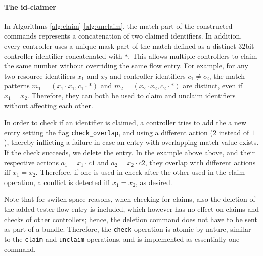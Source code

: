 \documentclass[conference]{sigcomm-alternate}
\newcommand{\concat}[0]{\cdot}
\newcommand{\claimcheck}{check\xspace}
\newcommand{\checko}{\texttt{check\_overlap}\xspace}
\begin{document}
\paragraph{The id-claimer}

In Algorithms \ref{alg:claim}-\ref{alg:unclaim}, 
the match part of the constructed commands represents a concatenation
of two claimed identifiers. 
In addition, every controller uses a unique mask part of the match
defined as a distinct $32$bit controller identifier concatenated with
\texttt{*}.
This allows multiple controllers to claim the same number without
overriding the same flow entry.
%
For example, for any two resource identifiers $x_1$ and $x_2$ and controller identifiers $c_1\neq c_2$,
the match patterns $m_1=(x_1\concat x_1, c_1\concat \texttt{*})$ and $ m_2=(x_2\concat x_2, c_2\concat \texttt{*})$ are distinct,
even if $x_1=x_2$. 
Therefore, they can both be used to claim and unclaim identifiers without affecting each other.

In order to check if an identifier is claimed, a controller tries to add the
a new entry setting the flag \texttt{\checko}, and using a different
action ($2$ instead of $1$), 
thereby inflicting a failure in case an entry with overlapping match value exists.
If the check succeeds, we delete the entry. 
In the example above above,
and their respective actions $a_1=x_1\concat c1$ and $a_2=x_2\concat c2$,  they overlap
with different actions iff $x_1=x_2$. Therefore, if one is used in \claimcheck after the other used in the claim operation,
a conflict is detected iff $x_1=x_2$, as desired.

Note that for switch space reasons, when checking for claims, also the deletion of the added tester flow entry is included,
which however has no effect on claims and checks of other controllers; hence, the deletion command does not
have to be sent as part of a bundle. Therefore, the \texttt{\claimcheck} operation is atomic by nature,
similar to the \texttt{claim} and \texttt{unclaim} operations, and is implemented as essentially one command.

\end{document}
